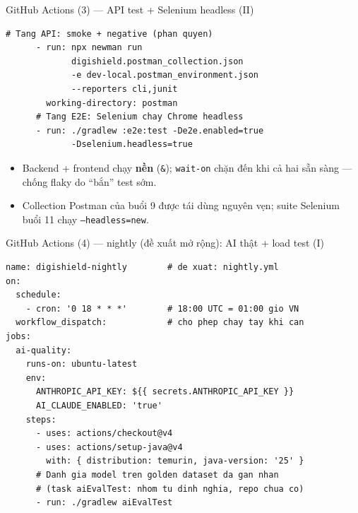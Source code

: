 \documentclass[aspectratio=169,12pt]{beamer}
\begin{document}
\begin{frame}[fragile]{GitHub Actions (3) --- API test + Selenium headless (II)}
  \vspace*{-0.4em}
\begin{lstlisting}[basicstyle=\ttfamily\scriptsize]
      # Tang API: smoke + negative (phan quyen)
      - run: npx newman run
             digishield.postman_collection.json
             -e dev-local.postman_environment.json
             --reporters cli,junit
        working-directory: postman
      # Tang E2E: Selenium chay Chrome headless
      - run: ./gradlew :e2e:test -De2e.enabled=true
             -Dselenium.headless=true
\end{lstlisting}

  \begin{itemize}\small
    \item Backend + frontend chạy \textbf{nền} (\texttt{\&}); \texttt{wait-on}
          chặn đến khi cả hai sẵn sàng --- chống flaky do ``bắn'' test sớm.
    \item Collection Postman của buổi 9 được tái dùng nguyên vẹn;
          suite Selenium buổi 11 chạy \texttt{--headless=new}.
  \end{itemize}
\end{frame}

\begin{frame}[fragile]{GitHub Actions (4) --- nightly (đề xuất mở rộng): AI thật + load test (I)}
  \vspace*{-0.4em}
\begin{lstlisting}[basicstyle=\ttfamily\scriptsize]
name: digishield-nightly        # de xuat: nightly.yml
on:
  schedule:
    - cron: '0 18 * * *'        # 18:00 UTC = 01:00 gio VN
  workflow_dispatch:            # cho phep chay tay khi can
jobs:
  ai-quality:
    runs-on: ubuntu-latest
    env:
      ANTHROPIC_API_KEY: ${{ secrets.ANTHROPIC_API_KEY }}
      AI_CLAUDE_ENABLED: 'true'
    steps:
      - uses: actions/checkout@v4
      - uses: actions/setup-java@v4
        with: { distribution: temurin, java-version: '25' }
      # Danh gia model tren golden dataset da gan nhan
      # (task aiEvalTest: nhom tu dinh nghia, repo chua co)
      - run: ./gradlew aiEvalTest
\end{lstlisting}
\end{frame}
\end{document}
